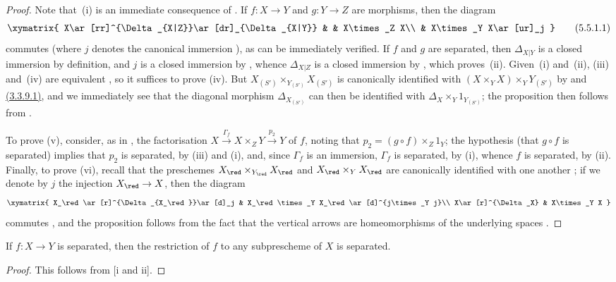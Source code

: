 \begin{proof}
Note that~(i) is an immediate consequence of .
If $f:X\to Y$ and $g:Y\to Z$ are morphisms, then the diagram
\[
\label{I.5.5.1.1}
  \xymatrix{
    X\ar[rr]^{\Delta_{X|Z}}\ar[dr]_{\Delta_{X|Y}} & &
    X\times_Z X\\
    & X\times_Y X\ar[ur]_j
  }
  \tag{5.5.1.1}
\]
commutes (where $j$ denotes the canonical immersion ), as can be immediately verified.
If $f$ and $g$ are separated, then $\Delta_{X|Y}$ is a closed immersion by definition, and $j$ is a closed immersion by , whence $\Delta_{X|Z}$ is a closed immersion by , which
proves~(ii).
Given~(i) and~(ii), (iii) and~(iv) are equivalent , so it suffices to prove (iv).
But $X_{(S')}\times_{Y_{(S')}}X_{(S')}$ is canonically identified with $(X\times_Y X)\times_Y Y_{(S')}$ by  and \hyperref[I.3.3.9]{(3.3.9.1)}, and we immediately see that the diagonal morphism $\Delta_{X_{(S')}}$ can then be identified with $\Delta_X\times_Y 1_{Y_{(S')}}$;
the proposition then follows from .

To prove (v), consider, as in , the factorisation $X\xrightarrow{\Gamma_f}X\times_Z Y\xrightarrow{p_2}Y$ of $f$, noting that $p_2=(g\circ f)\times_Z 1_Y$;
the hypothesis (that $g\circ f$ is separated) implies that $p_2$ is separated, by (iii) and (i), and, since $\Gamma_f$ is an immersion, $\Gamma_f$ is separated, by (i), whence $f$ is separated, by (ii).
Finally, to prove (vi), recall that the preschemes $X_\red\times_{Y_\red}X_\red$ and $X_\red\times_Y X_\red$ are canonically identified with one another ;
if we denote by $j$ the injection $X_\red\to X$, then the diagram
\[
  \xymatrix{
    X_\red\ar[r]^{\Delta_{X_\red}}\ar[d]_j &
    X_\red\times_Y X_\red\ar[d]^{j\times_Y j}\\
    X\ar[r]^{\Delta_X} &
    X\times_Y X
  }
\]
commutes , and the proposition follows from the fact that the vertical arrows are homeomorphisms of the underlying spaces .
\end{proof}

\begin{corollary}[5.5.2]
\label{I.5.5.2}
If $f:X\to Y$ is separated, then the restriction of $f$ to any subprescheme of $X$ is separated.
\end{corollary}

\begin{proof}
This follows from [i and ii].
\end{proof}

